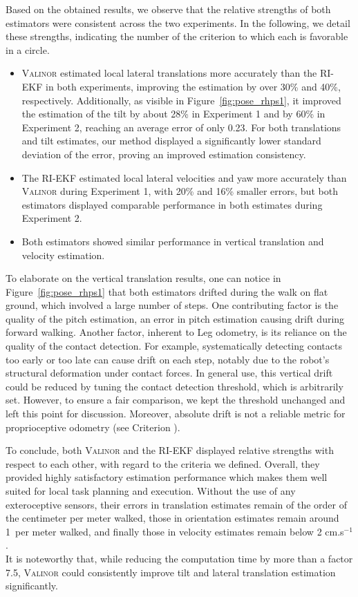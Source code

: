 \documentclass{IJCAS}
\newcommand{\critnum}[1]{\tikz[baseline=(char.base)]{
            \node[shape=circle,draw,inner sep=1pt](char){\textbf{#1}};}}
\begin{document}
Based on the obtained results, we observe that the relative strengths of both estimators were consistent across the two experiments. In the following, we detail these strengths, indicating the number of the criterion to which each is favorable in a circle.
\begin{itemize}
    \item {\scshape Valinor} estimated local lateral translations {\footnotesize\critnum{3}} more accurately than the RI-EKF in both experiments, improving the estimation by over 30\% and 40\%, respectively. Additionally, as visible in Figure~\ref{fig:pose_rhps1}, it improved the estimation of the tilt {\footnotesize\critnum{2}} by about 28\% in Experiment 1 and by 60\% in Experiment 2, reaching an average error of only 0.23\textdegree. For both translations and tilt estimates, our method displayed a significantly lower standard deviation of the error, proving an improved estimation consistency. 
    \item The RI-EKF estimated local lateral velocities {\footnotesize\critnum{2}} and yaw {\footnotesize\critnum{3}} more accurately than {\scshape Valinor} during Experiment 1, with 20\% and 16\% smaller errors, but both estimators displayed comparable performance in both estimates during Experiment 2.
    \item Both estimators showed similar performance in vertical translation {\footnotesize\critnum{3}} and velocity estimation. 
\end{itemize}
To elaborate on the vertical translation results, one can notice in Figure~\ref{fig:pose_rhps1} that both estimators drifted during the walk on flat ground, which involved a large number of steps. One contributing factor is the quality of the pitch estimation, an error in pitch estimation causing drift during forward walking. Another factor, inherent to Leg odometry, is its reliance on the quality of the contact detection. For example, systematically detecting contacts too early or too late can cause drift on each step, notably due to the robot's structural deformation under contact forces. In general use, this vertical drift could be reduced by tuning the contact detection threshold, which is arbitrarily set. However, to ensure a fair comparison, we kept the threshold unchanged and left this point for discussion. Moreover, absolute drift is not a reliable metric for proprioceptive odometry (see Criterion \critnum{3}).

To conclude, both {\scshape Valinor} and the RI-EKF displayed relative strengths with respect to each other, with regard to the criteria we defined. Overall, they provided highly satisfactory estimation performance which makes them well suited for local task planning and execution. Without the use of any exteroceptive sensors, their errors in translation estimates remain of the order of the centimeter per meter walked, those in orientation estimates remain around 1\textdegree \ per meter walked, and finally those in velocity estimates remain below 2 cm.s$^{-1}$. \\
It is noteworthy that, while reducing the computation time by more than a factor 7.5, {\scshape Valinor} could consistently improve tilt and lateral translation estimation significantly.
\end{document}
